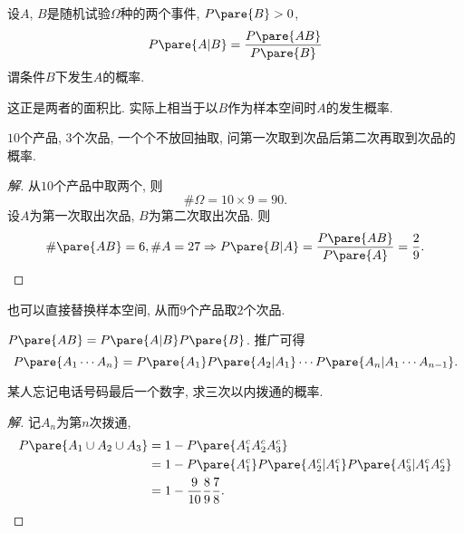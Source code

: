 \documentclass{ctexart}
\begin{document}
\begin{definition}[条件概率]
    设$A$, $B$是随机试验$\Omega$种的两个事件, $P\pare{B} > 0$,
    \[ P\pare{A\vert B} = \frac{P\pare{AB}}{P\pare{B}} \]
    谓条件$B$下发生$A$的概率.
\end{definition}
\begin{remark}
    这正是两者的面积比. 实际上相当于以$B$作为样本空间时$A$的发生概率.
\end{remark}
\begin{sample}
    \begin{ex}
        $10$个产品, $3$个次品, 一个个不放回抽取, 问第一次取到次品后第二次再取到次品的概率.
    \end{ex}
    \begin{proof}[解]
        从$10$个产品中取两个, 则
        \[ \#\Omega = 10\times 9 = 90. \]
        设$A$为第一次取出次品, $B$为第二次取出次品. 则
        \[ \#\pare{AB} = 6, \#A = 27\Rightarrow P\pare{B\vert A} = \frac{P\pare{AB}}{P\pare{A}} = \frac{2}{9}. \qedhere \]
    \end{proof}
    \begin{remark}
        也可以直接替换样本空间, 从而$9$个产品取$2$个次品.
    \end{remark}
\end{sample}
\begin{finale}
    \begin{theorem}[乘法定理]
        $P\pare{AB} = P\pare{A\vert B}P\pare{B}$. 推广可得
        \[ P\pare{A_1\cdots A_n} = P\pare{A_1}P\pare{A_2\vert A_1}\cdots P\pare{A_n\vert A_1\cdots A_{n-1}}. \]
    \end{theorem}
\end{finale}
\begin{sample}
    \begin{ex}
        某人忘记电话号码最后一个数字, 求三次以内拨通的概率.
    \end{ex}
    \begin{proof}[解]
        记$A_n$为第$n$次拨通,
        \begin{align*}
            P\pare{A_1 \cup A_2 \cup A_3} &= 1-P\pare{A_1^c A_2^c A_3^c}\\ &= 1 - P\pare{A_1^c}P\pare{A_2^c\vert A_1^c}P\pare{A_3^c\vert A_1^cA_2^c}\\ &= 1 - \frac{9}{10}\frac{8}{9}\frac{7}{8}. \qedhere
        \end{align*}
    \end{proof}
\end{sample}
\end{document}
